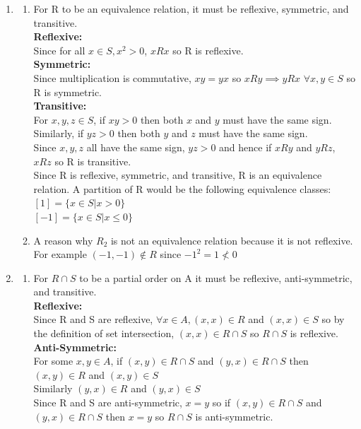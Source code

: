 \documentclass[11pt]{article}
\begin{document}
\begin{enumerate}[]
\item
	\begin{enumerate}[label=\alph*]
	\item For R to be an equivalence relation, it must be reflexive, symmetric, and transitive.\\
	\textbf{Reflexive:}\\
	Since for all $x\in S, x^2 > 0$, $xRx$ so R is reflexive.\\
	\textbf{Symmetric:}\\
	Since multiplication is commutative, $xy=yx$ so $xRy \implies yRx$ $\forall x,y\in S$ so R is symmetric. \\
	\textbf{Transitive:}\\
	For $x,y,z\in S$, if $xy>0$ then both $x$ and $y$ must have the same sign. Similarly, if $yz>0$ then both $y$ and $z$ must have the same sign.\\
	Since $x,y,z$ all have the same sign, $yz>0$ and hence if $xRy$ and $yRz$, $xRz$ so R is transitive. \\
	Since R is reflexive, symmetric, and transitive, R is an equivalence relation.
	A partition of R would be the following equivalence classes:\\
	$[1] = \{x\in S | x > 0\}$\\
	$[-1] = \{x\in S | x \leq 0\}$\\
	\item A reason why $R_2$ is not an equivalence relation because it is not reflexive. For example $(-1,-1) \not\in R$ since $-1^2 = 1  \not < 0$ 
	\end{enumerate}
\item
	\begin{enumerate}[label=\alph*]
	\item For $R \cap S$ to be a partial order on A it must be reflexive, anti-symmetric, and transitive.\\
	\textbf{Reflexive:}\\
	Since R and S are reflexive, $\forall x\in A, (x,x)\in R$ and $(x,x)\in S$ so by the definition of set intersection, $(x,x)\in R\cap S$ so $R\cap S$ is reflexive.\\
	\textbf{Anti-Symmetric:}\\
	For some $x,y\in A$, if $(x,y)\in R\cap S$ and $(y,x)\in R\cap S$ then $(x,y)\in R$ and $(x,y)\in S$\\
	Similarly $(y,x)\in R$ and $(y,x)\in S$\\
	Since R and S are anti-symmetric, $x=y$ so if $(x,y)\in R\cap S$ and $(y,x)\in R\cap S$ then $x=y$ so $R\cap S$ is anti-symmetric.\\

\end{enumerate}
\end{enumerate}
\end{document}
